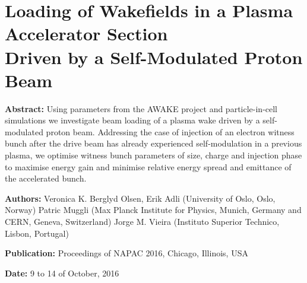 %
%

\chapter{Loading of Wakefields in a Plasma Accelerator Section\\
         Driven by a Self-Modulated Proton Beam}
\label{Pub:NAPAC16}

\begin{hangparas}{10mm}{1}

    \textbf{Abstract:}
    Using parameters from the AWAKE project and particle-in-cell simulations we investigate beam loading of a plasma wake driven by a self-modulated proton beam. Addressing the case of injection of an electron witness bunch after the drive beam has already experienced self-modulation in a previous plasma, we optimise witness bunch parameters of size, charge and injection phase to maximise energy gain and minimise relative energy spread and emittance of the accelerated bunch.

    \vspace{5mm}

    \textbf{Authors:}
    Veronica K. Berglyd Olsen, Erik Adli (University of Oslo, Oslo, Norway)
    Patric Muggli (Max Planck Institute for Physics, Munich, Germany and CERN, Geneva, Switzerland)
    Jorge M. Vieira (Instituto Superior Technico, Lisbon, Portugal)

    \vspace{5mm}

    \textbf{Publication:}
    Proceedings of NAPAC 2016, Chicago, Illinois, USA

    \vspace{5mm}

    \textbf{Date:} 9 to 14 of October, 2016


\end{hangparas}
